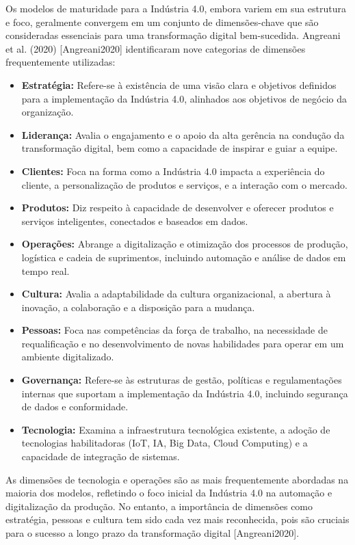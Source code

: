 Os modelos de maturidade para a Indústria 4.0, embora variem em sua estrutura e foco, geralmente convergem em um conjunto de dimensões-chave que são consideradas essenciais para uma transformação digital bem-sucedida. Angreani et al. (2020) [Angreani2020] identificaram nove categorias de dimensões frequentemente utilizadas:
\begin{itemize}
    \item \textbf{Estratégia:} Refere-se à existência de uma visão clara e objetivos definidos para a implementação da Indústria 4.0, alinhados aos objetivos de negócio da organização.
    \item \textbf{Liderança:} Avalia o engajamento e o apoio da alta gerência na condução da transformação digital, bem como a capacidade de inspirar e guiar a equipe.
    \item \textbf{Clientes:} Foca na forma como a Indústria 4.0 impacta a experiência do cliente, a personalização de produtos e serviços, e a interação com o mercado.
    \item \textbf{Produtos:} Diz respeito à capacidade de desenvolver e oferecer produtos e serviços inteligentes, conectados e baseados em dados.
    \item \textbf{Operações:} Abrange a digitalização e otimização dos processos de produção, logística e cadeia de suprimentos, incluindo automação e análise de dados em tempo real.
    \item \textbf{Cultura:} Avalia a adaptabilidade da cultura organizacional, a abertura à inovação, a colaboração e a disposição para a mudança.
    \item \textbf{Pessoas:} Foca nas competências da força de trabalho, na necessidade de requalificação e no desenvolvimento de novas habilidades para operar em um ambiente digitalizado.
    \item \textbf{Governança:} Refere-se às estruturas de gestão, políticas e regulamentações internas que suportam a implementação da Indústria 4.0, incluindo segurança de dados e conformidade.
    \item \textbf{Tecnologia:} Examina a infraestrutura tecnológica existente, a adoção de tecnologias habilitadoras (IoT, IA, Big Data, Cloud Computing) e a capacidade de integração de sistemas.
\end{itemize}

As dimensões de tecnologia e operações são as mais frequentemente abordadas na maioria dos modelos, refletindo o foco inicial da Indústria 4.0 na automação e digitalização da produção. No entanto, a importância de dimensões como estratégia, pessoas e cultura tem sido cada vez mais reconhecida, pois são cruciais para o sucesso a longo prazo da transformação digital [Angreani2020].

